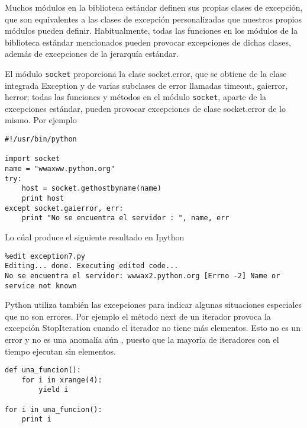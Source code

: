 \documentclass[twoside,10.5pt]{article}%
\begin{document}
Muchos m\'odulos en la biblioteca est\'andar definen sus propias clases de excepci\'on, que son equivalentes a las clases de excepci\'on personalizadas que nuestros propios m\'odulos pueden definir. Habitualmente, todas las funciones en los m\'odulos de la biblioteca est\'andar mencionados pueden provocar excepciones de dichas clases, adem\'as de excepciones de la jerarqu\'ia est\'andar. 

El m\'odulo \texttt{socket} proporciona la clase {\color{blue} socket.error}, que se obtiene de la clase integrada {\color{blue} Exception} y de varias subclases de error llamadas {\color{green}  timeout, gaierror, herror}; todas las funciones y m\'etodos en el m\'odulo \texttt{socket}, aparte de la excepciones est\'andar, pueden provocar excepciones de clase {\color{blue} socket.error} de lo mismo. Por ejemplo

\vspace{0.3cm}

\begin{verbatim}
#!/usr/bin/python

import socket
name = "wwaxww.python.org"
try:
    host = socket.gethostbyname(name)
    print host
except socket.gaierror, err:
    print "No se encuentra el servidor : ", name, err
\end{verbatim}

\vspace{0.3cm}

Lo c\'ual produce el siguiente resultado en Ipython

\begin{verbatim}
%edit exception7.py
Editing... done. Executing edited code...
No se encuentra el servidor: wwwax2.python.org [Errno -2] Name or service not known
\end{verbatim}

\vspace{0.3cm}

Python utiliza tambi\'en las excepciones para indicar algunas situaciones especiales que no son errores. Por ejemplo el m\'etodo {\color{blue} next} de un iterador provoca la excepci\'on {\color{blue} StopIteration} cuando el iterador no tiene m\'as elementos. Esto no es un error y no es una anomal\'ia a\'un , puesto que la mayor\'ia de iteradores con el tiempo ejecutan sin elementos. 


\vspace{0.3cm}

\begin{verbatim}
def una_funcion():
    for i in xrange(4):
        yield i

for i in una_funcion():
    print i
\end{verbatim}
\end{document}
